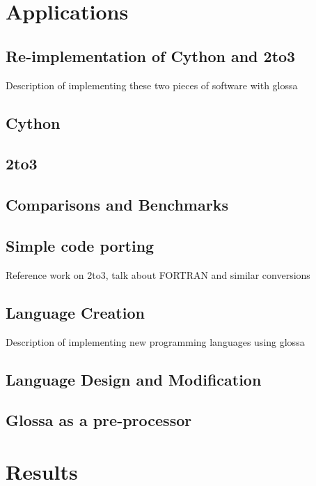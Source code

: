 \documentclass{article}
\begin{document}
\section{Applications}

\subsection{Re-implementation of Cython and 2to3}
Description of implementing these two pieces of software with glossa

\subsection{Cython}
\subsection{2to3}

\subsection{Comparisons and Benchmarks}

\subsection{Simple code porting}
Reference work on 2to3, talk about FORTRAN and similar conversions

\subsection{Language Creation}
Description of implementing new programming languages using glossa

\subsection{Language Design and Modification}
\subsection{Glossa as a pre-processor}

\section{Results}
\end{document}
